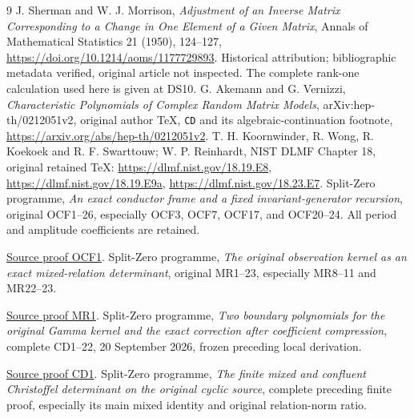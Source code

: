 \begin{thebibliography}{9}
 J. Sherman and W. J. Morrison,
\emph{Adjustment of an Inverse Matrix Corresponding to a Change in One
Element of a Given Matrix}, Annals of Mathematical Statistics
21 (1950), 124--127,
\url{https://doi.org/10.1214/aoms/1177729893}.
Historical attribution; bibliographic metadata verified, original article
not inspected. The complete rank-one calculation used here is given at DS10.
 G. Akemann and G. Vernizzi,
\emph{Characteristic Polynomials of Complex Random Matrix Models},
arXiv:hep-th/0212051v2, original author TeX, \texttt{CD} and its
algebraic-continuation footnote,
\url{https://arxiv.org/abs/hep-th/0212051v2}.
 T. H. Koornwinder, R. Wong, R. Koekoek and
R. F. Swarttouw; W. P. Reinhardt, NIST DLMF Chapter 18,
original retained TeX:
\url{https://dlmf.nist.gov/18.19.E8},
\url{https://dlmf.nist.gov/18.19.E9a},
\url{https://dlmf.nist.gov/18.23.E7}.
 Split-Zero programme,
\emph{An exact conductor frame and a fixed invariant-generator
recursion}, original OCF1--26, especially OCF3, OCF7, OCF17,
and OCF20--24. All period and amplitude coefficients are retained.

\href{https://github.com/KokunoYumeto/zeta-function-research-reader/blob/5992ad50c0f2a06921f1fcaded7b4e38097c0739/workbenches/splitzero-tandem/continuations/20260920-original-kernel-mixed-determinants/providers/ORIGINAL_CONDUCTOR_STRIP_FRAME.tex\#L27}{Source proof OCF1}.
 Split-Zero programme,
\emph{The original observation kernel as an exact mixed-relation
determinant}, original MR1--23, especially MR8--11 and MR22--23.

\href{https://github.com/KokunoYumeto/zeta-function-research-reader/blob/5992ad50c0f2a06921f1fcaded7b4e38097c0739/workbenches/splitzero-tandem/continuations/20260920-original-kernel-mixed-determinants/ORIGINAL_KERNEL_MIXED_DETERMINANT.tex\#L36}{Source proof MR1}.
 Split-Zero programme,
\emph{Two boundary polynomials for the original Gamma kernel and the
exact correction after coefficient compression}, complete CD1--22,
20 September 2026, frozen preceding local derivation.

\href{https://github.com/KokunoYumeto/zeta-function-research-reader/blob/main/workbenches/splitzero-tandem/continuations/20260921-kernel-degree-steps/COMPLETE_CD_BOUNDARY.tex\#L42}{Source proof CD1}.
 Split-Zero programme,
\emph{The finite mixed and confluent Christoffel determinant on the
original cyclic source}, complete preceding finite proof, especially
its main mixed identity and original relation-norm ratio.


\end{thebibliography}
